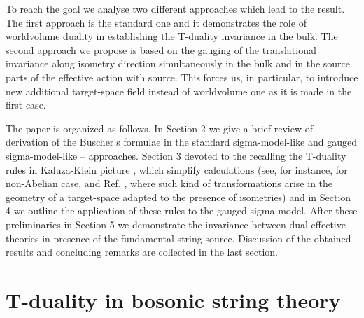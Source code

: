 \documentclass[a4paper,11pt]{article}
\begin{document}
To reach the goal we analyse two different approaches which lead to the result.
The first approach is the standard one and it demonstrates the role of 
worldvolume duality in establishing the T-duality invariance in the bulk. 
The second approach we propose is based on the gauging of the translational 
invariance along isometry direction simultaneously in the bulk and in the 
source parts of the effective action with source. This forces us, in 
particular, to introduce new additional target-space field instead of 
worldvolume one as it is made in the first case.

The paper is organized as follows. In Section 2 we give a brief
review of derivation of the Buscher's formulae in the standard
sigma-model-like \cite{buscher} and gauged sigma-model-like 
\cite{hs0}--\cite{ps} approaches. Section
3 devoted to the recalling the T-duality rules in 
Kaluza-Klein picture \cite{bek,bko}, which simplify calculations
(see, for instance, \cite{bm} for non-Abelian case, and Ref. \cite{borlaf}, 
where
such kind of transformations arise in the geometry of a target-space adapted to
the presence of isometries)
and in Section 4 we outline the application of
these rules to the
gauged-sigma-model. After these preliminaries in Section 5 we
demonstrate the invariance between dual effective theories in 
presence of the fundamental string source. Discussion of the
obtained results and concluding remarks are
collected in the last section.






\section{T-duality in bosonic string theory}
\end{document}
